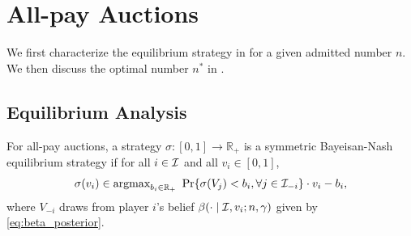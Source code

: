 
\section{All-pay Auctions}\label{sec:all-pay_auctions}





We first characterize the equilibrium strategy in  for a given admitted number $n$. We then discuss the optimal number $n^\ast$ in .

\subsection{Equilibrium Analysis}
\label{subsec:equilibrium_allpay}

\begin{definition}
\label{def:equilibrium_allpay}
For all-pay auctions, a strategy $\sigma:[0,1]\to \mathbb{R}_+$ is a symmetric Bayeisan-Nash equilibrium strategy if for all $i\in \mathcal{I}$ and all $v_i\in[0,1 ]$, 
\begin{align}
\label{eq:def_equilibrium_all_pay}
  \sigma(v_i)\in {\normalfont{\operatorname*{\text{argmax}}}}_{b_i\in \mathbb{R}_+}~  \Pr\{\sigma(V_j)<b_i,\forall j\in \mathcal{I}_{-i}\} \cdot v_i - b_i,  
\end{align}
where $V_{-i}$ draws from player $i$'s belief $\beta(\cdot\mid \mathcal{I},v_i;n,\gamma)$ given by \eqref{eq:beta_posterior}.
\end{definition}

